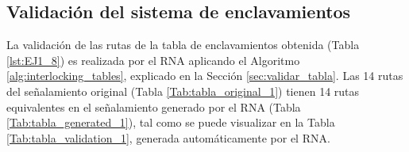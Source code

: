 \subsection{Validación del sistema de enclavamientos}
	
    La validación de las rutas de la tabla de enclavamientos obtenida (Tabla \ref{lst:EJ1_8}) es realizada por el RNA aplicando el Algoritmo \ref{alg:interlocking_tables}, explicado en la Sección \ref{sec:validar_tabla}. Las 14 rutas del señalamiento original (Tabla \ref{Tab:tabla_original_1}) tienen 14 rutas equivalentes en el señalamiento generado por el RNA (Tabla \ref{Tab:tabla_generated_1}), tal como se puede visualizar en la Tabla \ref{Tab:tabla_validation_1}, generada automáticamente por el RNA.

    \begin{table}[H]
        {
        \caption{Equivalencias entre las rutas originales y las generadas por el RNA.}
        \label{Tab:tabla_validation_1}
        \centering
            \begin{center}
            \end{center}
        }    
    \end{table}
